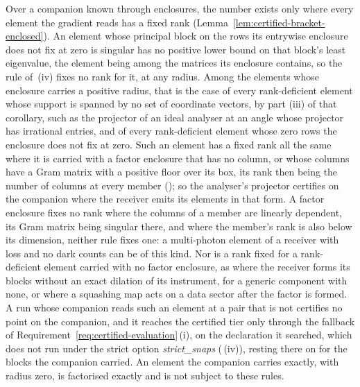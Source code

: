 \begin{remark}
Over a companion known through enclosures, the number exists only where
every element the gradient reads has a fixed rank
(Lemma~\ref{lem:certified-bracket-enclosed}). An element whose principal
block on the rows its entrywise enclosure does not fix at zero is singular
has no positive lower bound on that block's least eigenvalue, the element
being among the matrices its enclosure contains, so the rule of
\,(iv) fixes no rank
for it, at any radius. Among the elements whose enclosure carries a
positive radius, that is the case of every rank-deficient element whose
support is spanned by no set of coordinate vectors, by part (iii) of that
corollary, such as the projector of an ideal analyser at an angle whose
projector has irrational entries, and of every rank-deficient element whose
zero rows the enclosure does not fix at zero. Such an element has a fixed
rank all the same where it is carried with a factor enclosure that has no
column, or whose columns have a Gram matrix with a positive floor over its
box, its rank then being the number of columns at every member
(); so the analyser's
projector certifies on the companion where the receiver emits its elements
in that form. A factor enclosure fixes no rank where the columns of a member
are linearly dependent, its Gram matrix being singular there, and where the
member's rank is also below its dimension, neither rule fixes one: a
multi-photon element of a receiver with loss and no dark counts can be of
this kind. Nor is a rank fixed for a rank-deficient element carried with no
factor enclosure, as where the receiver forms its blocks without an exact
dilation of its instrument, for a generic component with none, or where a squashing map acts on a data sector after
the factor is formed. A run whose companion reads such an element at a pair
that is not  certifies no point on the companion, and it
reaches the certified tier only through the fallback of
Requirement~\ref{req:certified-evaluation}\,(i), on the declaration it
searched, which does not run under the strict option \emph{strict\_snaps}
(\,(iv)), resting there on
 for the blocks the companion
carried. An element the companion carries exactly,
with radius zero, is factorised exactly and is not subject to these rules.
\end{remark}
